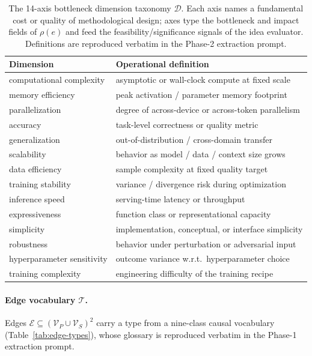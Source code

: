 \documentclass{opendatalab}
\begin{document}
\begin{table}[h]
\centering
\caption{The 14-axis bottleneck dimension taxonomy $\mathcal{D}$. Each axis names a fundamental cost or quality of
methodological design; axes type the bottleneck and impact fields of $\rho(e)$ and feed the
feasibility/significance signals of the idea evaluator. Definitions are reproduced verbatim in the Phase-2
extraction prompt.}
\label{tab:dim-taxonomy}
\begin{tabularx}{\linewidth}{l X}
\toprule
Dimension & Operational definition \\
\midrule
computational complexity & asymptotic or wall-clock compute at fixed scale \\
memory efficiency & peak activation / parameter memory footprint \\
parallelization & degree of across-device or across-token parallelism \\
accuracy & task-level correctness or quality metric \\
generalization & out-of-distribution / cross-domain transfer \\
scalability & behavior as model / data / context size grows \\
data efficiency & sample complexity at fixed quality target \\
training stability & variance / divergence risk during optimization \\
inference speed & serving-time latency or throughput \\
expressiveness & function class or representational capacity \\
simplicity & implementation, conceptual, or interface simplicity \\
robustness & behavior under perturbation or adversarial input \\
hyperparameter sensitivity & outcome variance w.r.t.\ hyperparameter choice \\
training complexity & engineering difficulty of the training recipe \\
\bottomrule
\end{tabularx}
\end{table}

\paragraph{Edge vocabulary $\mathcal{T}$.}
Edges $\mathcal{E}\subseteq(\mathcal{V}_P\cup\mathcal{V}_S)^2$ carry a type from a nine-class causal vocabulary
(Table~\ref{tab:edge-types}), whose glossary is reproduced verbatim in the Phase-1 extraction prompt.
\end{document}
